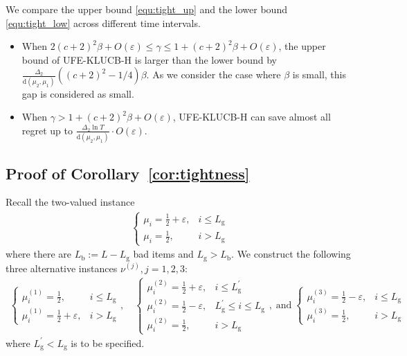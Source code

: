 \documentclass[twoside,11pt]{article}
\newcommand{\rmb}{\mathrm{b}}
\newcommand{\rmd}{\mathrm{d}}
\newcommand{\rmg}{\mathrm{g}}
\newcommand{\ouralg}{\textsc{UFE-KLUCB-H}}
\begin{document}
 We compare the upper bound \eqref{equ:tight_up} and the lower bound \eqref{equ:tight_low} across different time intervals. 
\begin{itemize}[parsep=1em]
    \item When $2 (c+2)^2\beta + O(\varepsilon) \leq \gamma \leq
            1 + (c+2)^2\beta + O(\varepsilon)$,
            the upper bound of \ouralg{} is larger than the lower bound by $ \frac{\Delta_2}{\rmd(\mu_2,\mu_1)}((c+2)^2-1/4)\beta$.
            As we consider the case where $\beta$ is small, this gap is considered as small.
    \item When $\gamma>1 + (c+2)^2\beta + O(\varepsilon)$, \ouralg{} can save almost all regret up to $\frac{\Delta_{2}\ln T}{\rmd(\mu_2,\mu_1)}\cdot O(\varepsilon)$.
\end{itemize}



\subsection{Proof of Corollary~\ref{cor:tightness}}\label{app:tightness_two_value}
Recall the two-valued instance
\begin{align}
    \begin{cases}
        \mu_i = \frac{1}{2}+\varepsilon,& i\leq L_{\rmg} 
        \\
        \mu_i = \frac{1}{2},&i> L_{\rmg} 
    \end{cases}
\end{align}
where there are $L_{\rmb}:=L-L_{\rmg}$ bad items and $L_{\rmg}>L_{\rmb}$.
We construct the following three alternative instances $\nu^{(j)},j=1,2,3 $:
\begin{align}
    \begin{cases}
       \mu_i^{(1)} = \frac{1}{2},& i\leq L_{\rmg} 
        \\
        \mu_i^{(1)} = \frac{1}{2}+\varepsilon, &i> L_{\rmg} 
    \end{cases},
    \quad
    \begin{cases}
        \mu_i^{(2)} = \frac{1}{2}+\varepsilon,& i\leq L_{\rmg}^\prime 
        \\
        \mu_i^{(2)} = \frac{1}{2}-\varepsilon,& L_{\rmg}^\prime \leq i\leq L_{\rmg} 
        \\
        \mu_i^{(2)} = \frac{1}{2}, &i> L_{\rmg} 
    \end{cases},
    \;\mbox{and}\;
    \begin{cases}
        \mu_i^{(3)} = \frac{1}{2}-\varepsilon,& i\leq L_{\rmg}
        \\
        \mu_i^{(3)} = \frac{1}{2},& i> L_{\rmg} 
    \end{cases}
\end{align}
where $L_{\rmg}^\prime<L_{\rmg}$ is to be specified.
\end{document}
